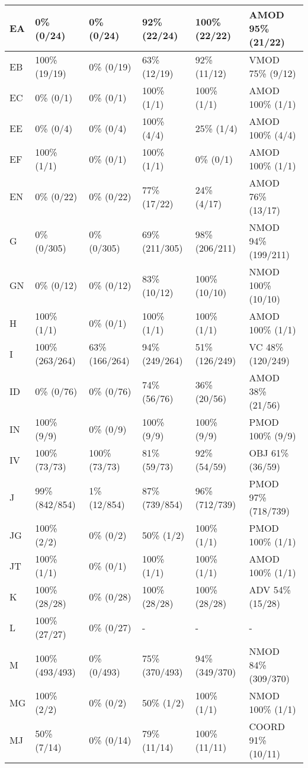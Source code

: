 \begin{small}
\begin{longtable}{|l|l|l|l|l|l|}
\hline
EA & 0\% (0/24) & 0\% (0/24) & 92\% (22/24) & 100\% (22/22) & AMOD 95\% (21/22) \\ 
\hline
EB & 100\% (19/19) & 0\% (0/19) & 63\% (12/19) & 92\% (11/12) & VMOD 75\% (9/12) \\ 
\hline
EC & 0\% (0/1) & 0\% (0/1) & 100\% (1/1) & 100\% (1/1) & AMOD 100\% (1/1) \\ 
\hline
EE & 0\% (0/4) & 0\% (0/4) & 100\% (4/4) & 25\% (1/4) & AMOD 100\% (4/4) \\ 
\hline
EF & 100\% (1/1) & 0\% (0/1) & 100\% (1/1) & 0\% (0/1) & AMOD 100\% (1/1) \\ 
\hline
EN & 0\% (0/22) & 0\% (0/22) & 77\% (17/22) & 24\% (4/17) & AMOD 76\% (13/17) \\ 
\hline
G & 0\% (0/305) & 0\% (0/305) & 69\% (211/305) & 98\% (206/211) & NMOD 94\% (199/211) \\ 
\hline
GN & 0\% (0/12) & 0\% (0/12) & 83\% (10/12) & 100\% (10/10) & NMOD 100\% (10/10) \\ 
\hline
H & 100\% (1/1) & 0\% (0/1) & 100\% (1/1) & 100\% (1/1) & AMOD 100\% (1/1) \\ 
\hline
I & 100\% (263/264) & 63\% (166/264) & 94\% (249/264) & 51\% (126/249) & VC 48\% (120/249) \\ 
\hline
ID & 0\% (0/76) & 0\% (0/76) & 74\% (56/76) & 36\% (20/56) & AMOD 38\% (21/56) \\ 
\hline
IN & 100\% (9/9) & 0\% (0/9) & 100\% (9/9) & 100\% (9/9) & PMOD 100\% (9/9) \\ 
\hline
IV & 100\% (73/73) & 100\% (73/73) & 81\% (59/73) & 92\% (54/59) & OBJ 61\% (36/59) \\ 
\hline
J & 99\% (842/854) & 1\% (12/854) & 87\% (739/854) & 96\% (712/739) & PMOD 97\% (718/739) \\ 
\hline
JG & 100\% (2/2) & 0\% (0/2) & 50\% (1/2) & 100\% (1/1) & PMOD 100\% (1/1) \\ 
\hline
JT & 100\% (1/1) & 0\% (0/1) & 100\% (1/1) & 100\% (1/1) & AMOD 100\% (1/1) \\ 
\hline
K & 100\% (28/28) & 0\% (0/28) & 100\% (28/28) & 100\% (28/28) & ADV 54\% (15/28) \\ 
\hline
L & 100\% (27/27) & 0\% (0/27) & - & - & - \\ 
\hline
M & 100\% (493/493) & 0\% (0/493) & 75\% (370/493) & 94\% (349/370) & NMOD 84\% (309/370) \\ 
\hline
MG & 100\% (2/2) & 0\% (0/2) & 50\% (1/2) & 100\% (1/1) & NMOD 100\% (1/1) \\ 
\hline
MJ & 50\% (7/14) & 0\% (0/14) & 79\% (11/14) & 100\% (11/11) & COORD 91\% (10/11) \\ 

\end{longtable}
\end{small}
